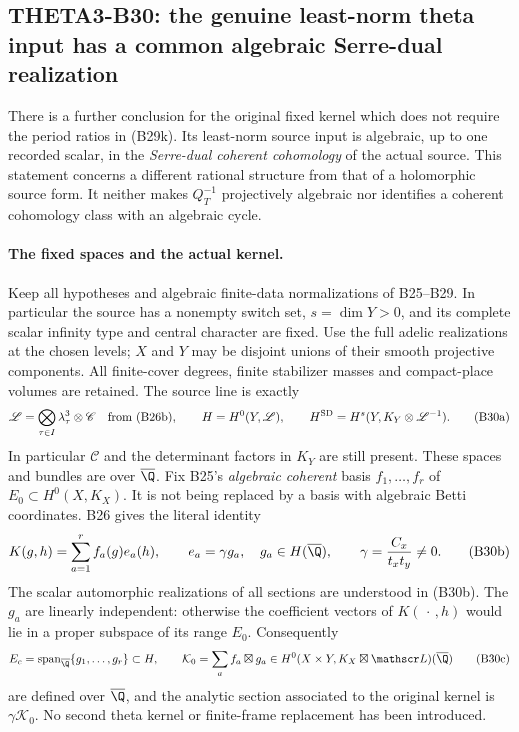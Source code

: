 \subsection{THETA3-B30: the genuine least-norm theta input has a common algebraic Serre-dual realization}\label{B30}

There is a further conclusion for the original fixed kernel which does
not require the period ratios in (B29k).  Its least-norm source input
is algebraic, up to one recorded scalar, in the \emph{Serre-dual
coherent cohomology} of the actual source.  This statement concerns a
different rational structure from that of a holomorphic source form.
It neither makes $Q_T^{-1}$ projectively algebraic nor identifies a
coherent cohomology class with an algebraic cycle.

\paragraph{The fixed spaces and the actual kernel.}
Keep all hypotheses and algebraic finite-data normalizations of
B25--B29.  In particular the source has a nonempty switch set,
$s=\dim Y>0$, and its complete scalar infinity type and central
character are fixed.  Use the full adelic realizations at the chosen
levels; $X$ and $Y$ may be disjoint unions of their smooth projective
components.  All finite-cover degrees, finite stabilizer masses and
compact-place volumes are retained.  The source line is exactly
\[
 \mathscr L=\bigotimes_{\tau\in I}\lambda_\tau^3\otimes\mathscr C
 \quad\hbox{from (B26b)},\qquad
 H=H^0(Y,\mathscr L),\qquad
 H^{\mathrm{SD}}=H^s(Y,K_Y\otimes\mathscr L^{-1}).
 \tag{B30a}
\]
In particular $\mathscr C$ and the determinant factors in $K_Y$
are still present.  These spaces and bundles are over
$\overline\Q$.  Fix B25's \emph{algebraic coherent} basis
$f_1,\ldots,f_r$ of $E_0\subset H^0(X,K_X)$.
It is not being replaced by a basis with algebraic Betti coordinates.
B26 gives the literal identity
\[
 K(g,h)=\sum_{a=1}^r f_a(g)e_a(h),\qquad
 e_a=\gamma g_a,\quad g_a\in H(\overline\Q),\qquad
 \gamma=\frac{C_x}{t_xt_y}\ne0.
 \tag{B30b}
\]
The scalar automorphic realizations of all sections are understood
in (B30b).  The $g_a$ are linearly independent: otherwise the
coefficient vectors of $K(\,\cdot\,,h)$ would lie in a proper
subspace of its range $E_0$.  Consequently
\[
 E_c=\operatorname{span}_{\overline\Q}\{g_1,\ldots,g_r\}\subset H,
 \qquad
 \mathcal K_0=\sum_a f_a\boxtimes g_a
       \in H^0(X\times Y,K_X\boxtimes\mathscr L)
                         (\overline\Q)
 \tag{B30c}
\]
are defined over $\overline\Q$, and the analytic section associated
to the original kernel is $\gamma\mathcal K_0$.
No second theta kernel or finite-frame replacement has been introduced.

